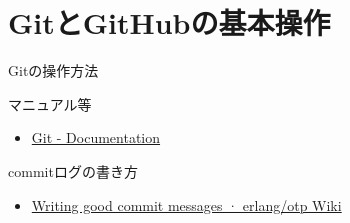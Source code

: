 \documentclass[t, aspectratio=169]{beamer}
\begin{document}
\section{GitとGitHubの基本操作}
\label{sec-2-3}
\begin{frame}[label=sec-2-3-1]{Gitの操作方法}
\begin{block}{マニュアル等}
\begin{itemize}
\item \href{http://git-scm.com/doc}{Git - Documentation}
\end{itemize}
\end{block}

\begin{block}{commitログの書き方}
\begin{itemize}
\item \href{https://github.com/erlang/otp/wiki/Writing-good-commit-messages}{Writing good commit messages · erlang/otp Wiki}
\end{itemize}
\end{block}
\end{frame}
\end{document}
